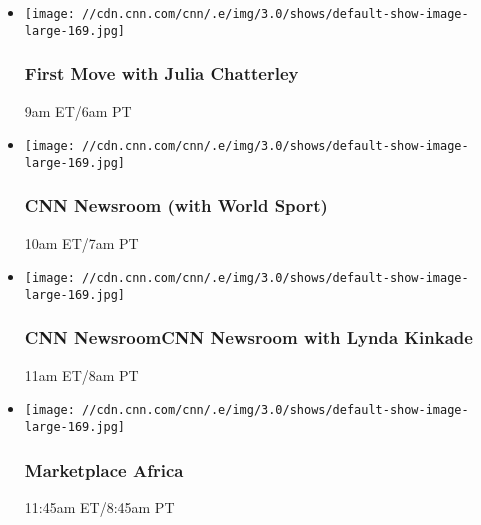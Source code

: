 \begin{itemize}
\item
  \texttt{[image: //cdn.cnn.com/cnn/.e/img/3.0/shows/default-show-image-large-169.jpg]}

  \hypertarget{first-move-with-julia-chatterley-4}{%
  \subsubsection{First Move with Julia
  Chatterley}\label{first-move-with-julia-chatterley-4}}

  9am ET/6am PT
\end{itemize}

\begin{itemize}
\item
  \texttt{[image: //cdn.cnn.com/cnn/.e/img/3.0/shows/default-show-image-large-169.jpg]}

  \hypertarget{cnn-newsroom-with-world-sport}{%
  \subsubsection{CNN Newsroom (with World
  Sport)}\label{cnn-newsroom-with-world-sport}}

  10am ET/7am PT
\end{itemize}

\begin{itemize}
\item
  \texttt{[image: //cdn.cnn.com/cnn/.e/img/3.0/shows/default-show-image-large-169.jpg]}

  \hypertarget{cnn-newsroomcnn-newsroom-with-lynda-kinkade--3}{%
  \subsubsection{CNN NewsroomCNN Newsroom with Lynda Kinkade
  }\label{cnn-newsroomcnn-newsroom-with-lynda-kinkade--3}}

  11am ET/8am PT
\end{itemize}

\begin{itemize}
\item
  \texttt{[image: //cdn.cnn.com/cnn/.e/img/3.0/shows/default-show-image-large-169.jpg]}

  \hypertarget{marketplace-africa-6}{%
  \subsubsection{Marketplace Africa}\label{marketplace-africa-6}}

  11:45am ET/8:45am PT
\end{itemize}

